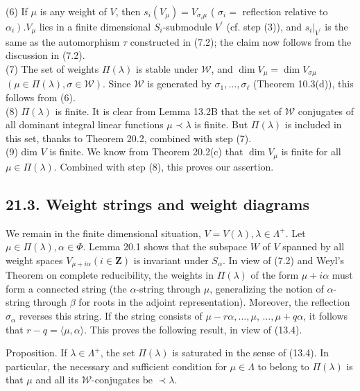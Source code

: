 \documentclass[10pt]{article}
\begin{document}
(6) If $\mu$ is any weight of $V$, then $s_{i}\left(V_{\mu}\right)=V_{\sigma_{i} \mu}$ ( $\sigma_{i}=$ reflection relative to $\left.\alpha_{i}\right) . V_{\mu}$ lies in a finite dimensional $S_{i}$-submodule $V^{\prime}$ (cf. step (3)), and $\left.s_{i}\right|_{V^{\prime}}$ is the same as the automorphism $\tau$ constructed in (7.2); the claim now follows from the discussion in (7.2).\\
(7) The set of weights $\Pi(\lambda)$ is stable under $\mathscr{W}$, and $\operatorname{dim} V_{\mu}=\operatorname{dim} V_{\sigma \mu}$ $(\mu \in \Pi(\lambda), \sigma \in \mathscr{W})$. Since $\mathscr{W}$ is generated by $\sigma_{1}, \ldots, \sigma_{\ell}$ (Theorem 10.3(d)), this follows from (6).\\
(8) $\Pi(\lambda)$ is finite. It is clear from Lemma 13.2B that the set of $\mathscr{W}$ conjugates of all dominant integral linear functions $\mu \prec \lambda$ is finite. But $\Pi(\lambda)$ is included in this set, thanks to Theorem 20.2, combined with step (7).\\
(9) dim $V$ is finite. We know from Theorem 20.2(c) that $\operatorname{dim} V_{\mu}$ is finite for all $\mu \in \Pi(\lambda)$. Combined with step (8), this proves our assertion.

\subsection*{21.3. Weight strings and weight diagrams}
We remain in the finite dimensional situation, $V=V(\lambda), \lambda \in \Lambda^{+}$. Let $\mu \in \Pi(\lambda), \alpha \in \Phi$. Lemma 20.1 shows that the subspace $W$ of $V$ spanned by all weight spaces $V_{\mu+i \alpha}(i \in \mathbf{Z})$ is invariant under $S_{\alpha}$. In view of (7.2) and Weyl's Theorem on complete reducibility, the weights in $\Pi(\lambda)$ of the form $\mu+i \alpha$ must form a connected string (the $\alpha$-string through $\mu$, generalizing the notion of $\alpha$-string through $\beta$ for roots in the adjoint representation). Moreover, the reflection $\sigma_{\alpha}$ reverses this string. If the string consists of $\mu-r \alpha, \ldots, \mu$, $\ldots, \mu+q \alpha$, it follows that $r-q=\langle\mu, \alpha\rangle$. This proves the following result, in view of (13.4).

Proposition. If $\lambda \in \Lambda^{+}$, the set $\Pi(\lambda)$ is saturated in the sense of (13.4). In particular, the necessary and sufficient condition for $\mu \in \Lambda$ to belong to $\Pi(\lambda)$ is that $\mu$ and all its $\mathscr{W}$-conjugates be $\prec \lambda$.
\end{document}
